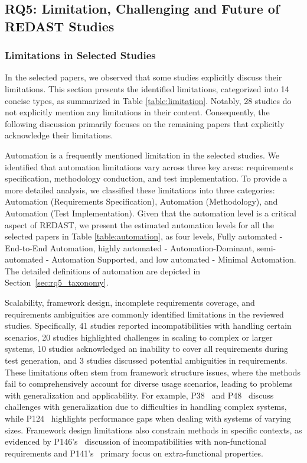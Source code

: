 \subsection{RQ5: Limitation, Challenging and Future of REDAST Studies}

\subsubsection{Limitations in Selected Studies}

In the selected papers, we observed that some studies explicitly discuss their limitations. This section presents the identified limitations, categorized into 14 concise types, as summarized in Table \ref{table:limitation}. Notably, 28 studies do not explicitly mention any limitations in their content. Consequently, the following discussion primarily focuses on the remaining papers that explicitly acknowledge their limitations.


Automation is a frequently mentioned limitation in the selected studies. We identified that automation limitations vary across three key areas: requirements specification, methodology conduction, and test implementation. To provide a more detailed analysis, we classified these limitations into three categories: Automation (Requirements Specification), Automation (Methodology), and Automation (Test Implementation). Given that the automation level is a critical aspect of REDAST, we present the estimated automation levels for all the selected papers in Table \ref{table:automation}, as four levels, Fully automated - End-to-End Automation, highly automated - Automation-Dominant, semi-automated - Automation Supported, and low automated - Minimal Automation. The detailed definitions of automation are depicted in Section~\ref{sec:rq5_taxonomy}.

Scalability, framework design, incomplete requirements coverage, and requirements ambiguities are commonly identified limitations in the reviewed studies. Specifically, 41 studies reported incompatibilities with handling certain scenarios, 20 studies highlighted challenges in scaling to complex or larger systems, 10 studies acknowledged an inability to cover all requirements during test generation, and 3 studies discussed potential ambiguities in requirements. These limitations often stem from framework structure issues, where the methods fail to comprehensively account for diverse usage scenarios, leading to problems with generalization and applicability. For example, P38~ and P48~ discuss challenges with generalization due to difficulties in handling complex systems, while P124~ highlights performance gaps when dealing with systems of varying sizes. Framework design limitations also constrain methods in specific contexts, as evidenced by P146’s~ discussion of incompatibilities with non-functional requirements and P141’s~ primary focus on extra-functional properties.

